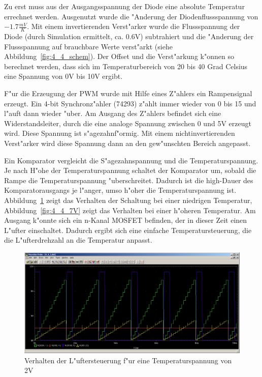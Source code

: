 Zu erst muss aus der Ausgangsspannung der Diode eine absolute Temperatur errechnet werden. Ausgenutzt wurde die "Anderung der Diodenflussspannung von $-1.7\frac{mV}{K}$. Mit einem invertierenden Verst"arker wurde die Flussspannung der Diode (durch Simulation ermittelt, ca. 0.6V) subtrahiert und die "Anderung der Flussspannung auf brauchbare Werte verst"arkt (siehe Abbildung~\ref{fig:4_4_schem}). Der Offset und die Verst"arkung k"onnen so berechnet werden, dass sich im Temperaturbereich von 20 bis 40 Grad Celsius eine Spannung von 0V bis 10V ergibt.

F"ur die Erzeugung der PWM wurde mit Hilfe eines Z"ahlers ein Rampensignal erzeugt. Ein 4-bit Synchronz"ahler (74293) z"ahlt immer wieder von 0 bis 15 und l"auft dann wieder "uber. Am Ausgang des Z"ahlers befindet sich eine Widerstandsleiter, durch die eine analoge Spannung zwischen 0 und 5V erzeugt wird. Diese Spannung ist s"agezahnf"ormig. Mit einem nichtinvertierenden Verst"arker wird diese Spannung dann an den gew"unschten Bereich angepasst.

Ein Komparator vergleicht die S"agezahnspannung und die Temperaturspannung. Je nach H"ohe der Temperaturspannung schaltet der Komparator um, sobald die Rampe die Temperaturspannung "uberschreitet. Dadurch ist die high-Dauer des Komparatorausgangs je l"anger, umso h"oher die Temperaturspannung ist. Abbildung~\ref{fig:4_4_2V} zeigt das Verhalten der Schaltung bei einer niedrigen Temperatur, Abbildung~\ref{fig:4_4_7V} zeigt das Verhalten bei einer h"oheren Temperatur. Am Ausgang k"onnte sich ein n-Kanal MOSFET befinden, der in dieser Zeit einen L"ufter einschaltet. Dadurch ergibt sich eine einfache Temperatursteuerung, die die L"ufterdrehzahl an die Temperatur anpasst.

\begin{figure}[ht]
 \centering
 \includegraphics[width=\textwidth]{./img/4_4_2V.PNG}
 \caption{Verhalten der L"uftersteuerung f"ur eine Temperaturspannung von 2V}
 \label{fig:4_4_2V}
\end{figure}

